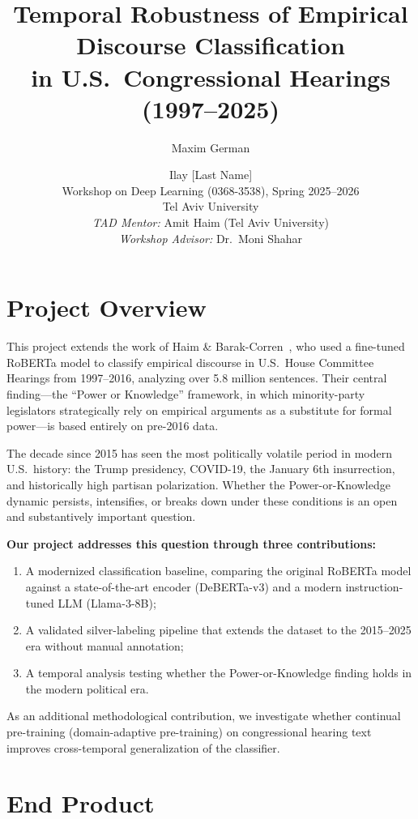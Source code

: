 \documentclass[11pt,a4paper]{article}
\title{\vspace{-1.5cm}\textbf{Temporal Robustness of Empirical Discourse Classification\\in U.S.\ Congressional Hearings (1997--2025)}}
\author{
  Maxim German \and Ilay [Last Name]\\[0.3em]
  \small Workshop on Deep Learning (0368-3538), Spring 2025--2026\\
  \small Tel Aviv University\\[0.3em]
  \small \textit{TAD Mentor:} Amit Haim (Tel Aviv University)\\
  \small \textit{Workshop Advisor:} Dr.\ Moni Shahar
}
\date{}
\begin{document}
\maketitle
\vspace{-0.5cm}

\section{Project Overview}

This project extends the work of Haim \& Barak-Corren~\cite{haim2026}, who used a fine-tuned RoBERTa model to classify empirical discourse in U.S.\ House Committee Hearings from 1997--2016, analyzing over 5.8 million sentences.
Their central finding---the ``Power or Knowledge'' framework, in which minority-party legislators strategically rely on empirical arguments as a substitute for formal power---is based entirely on pre-2016 data.

The decade since 2015 has seen the most politically volatile period in modern U.S.\ history: the Trump presidency, COVID-19, the January 6th insurrection, and historically high partisan polarization.
Whether the Power-or-Knowledge dynamic persists, intensifies, or breaks down under these conditions is an open and substantively important question.

\textbf{Our project addresses this question through three contributions:}
\begin{enumerate}[nosep]
  \item A modernized classification baseline, comparing the original RoBERTa model against a state-of-the-art encoder (DeBERTa-v3) and a modern instruction-tuned LLM (Llama-3-8B);
  \item A validated silver-labeling pipeline that extends the dataset to the 2015--2025 era without manual annotation;
  \item A temporal analysis testing whether the Power-or-Knowledge finding holds in the modern political era.
\end{enumerate}

As an additional methodological contribution, we investigate whether continual pre-training (domain-adaptive pre-training) on congressional hearing text improves cross-temporal generalization of the classifier.

\section{End Product}
\end{document}
